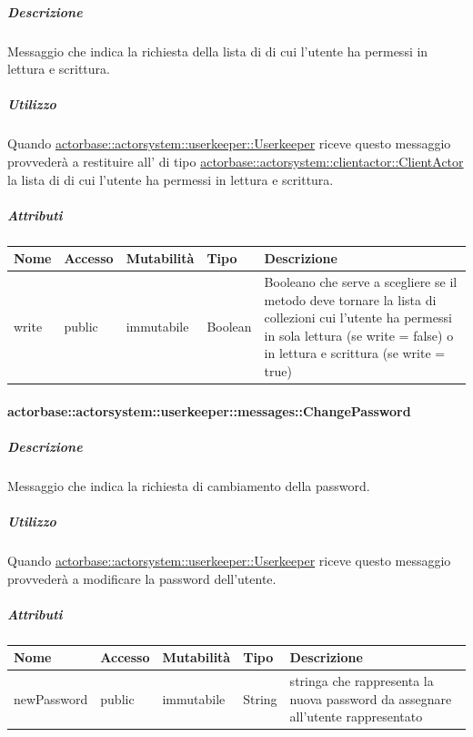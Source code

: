 \documentclass{scalatekids-article}
\begin{document}
\subparagraph{Descrizione}
Messaggio che indica la richiesta della lista di  di cui
l'utente ha permessi in lettura e scrittura.

\subparagraph{Utilizzo}
Quando \hyperref[sec:actorbase::actorsystem::userkeeper::Userkeeper]{actorbase::\allowbreak{}actorsystem::\allowbreak{}userkeeper::\allowbreak{}Userkeeper}
riceve questo messaggio provvederà a restituire all' di tipo
\hyperref[sec:actorbase::actorsystem::clientactor::ClientActor]{actorbase::\allowbreak{}actorsystem::\allowbreak{}clientactor::\allowbreak{}ClientActor}
la lista di  di cui l'utente ha permessi in lettura
e scrittura.

\subparagraph{Attributi}
\begin{tabular}{| p{3cm} | p{1.5cm} | p{2cm} | p{2cm} | p{8.5cm} |}
  \hline
  Nome & Accesso & Mutabilità & Tipo & Descrizione\\
  \hline
  write & public & immutabile & Boolean & Booleano che serve a scegliere se il metodo deve tornare la lista di collezioni cui l'utente ha permessi in sola lettura (se write = false) o in lettura e scrittura (se write = true) \\
  \hline
\end{tabular}


\paragraph{actorbase::actorsystem::userkeeper::messages::ChangePassword}
\label{sec:actorbase::actorsystem::userkeeper::messages::ChangePassword}

\subparagraph{Descrizione}
Messaggio che indica la richiesta di cambiamento della password.

\subparagraph{Utilizzo}
Quando \hyperref[sec:actorbase::actorsystem::userkeeper::Userkeeper]{actorbase::\allowbreak{}actorsystem::\allowbreak{}userkeeper::\allowbreak{}Userkeeper}
riceve questo messaggio provvederà a modificare la password dell'utente.

\subparagraph{Attributi}
\begin{tabular}{| p{3cm} | p{1.5cm} | p{2cm} | p{2cm} | p{8.5cm} |}
  \hline
  Nome & Accesso & Mutabilità & Tipo & Descrizione\\
  \hline
  newPassword & public & immutabile & String & stringa che rappresenta la nuova password da assegnare all'utente rappresentato \\
  \hline
\end{tabular}
\end{document}

